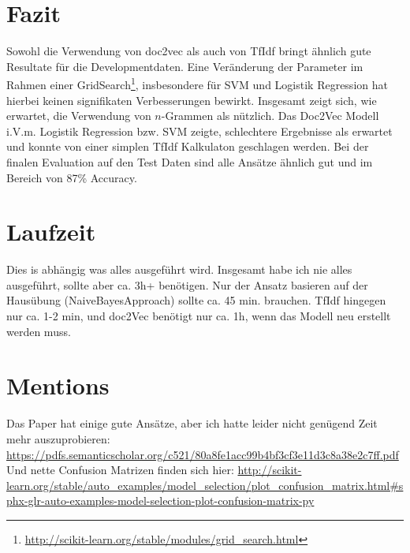 \documentclass[12pt]{scrartcl}
\begin{document}
    \section{Fazit}
    Sowohl die Verwendung von doc2vec als auch von TfIdf bringt ähnlich gute Resultate für die Developmentdaten.
    Eine Veränderung der Parameter im Rahmen einer GridSearch\footnote{\url{http://scikit-learn.org/stable/modules/grid_search.html}},
    insbesondere für SVM und Logistik Regression hat hierbei keinen signifikaten Verbesserungen bewirkt.
    Insgesamt zeigt sich, wie erwartet, die Verwendung von $n$-Grammen als nützlich.
    Das Doc2Vec Modell i.V.m. Logistik Regression bzw. SVM zeigte, schlechtere Ergebnisse als erwartet und konnte von einer
    \glqq{}simplen\grqq{} TfIdf Kalkulaton geschlagen werden.
    Bei der finalen Evaluation auf den Test Daten sind alle Ansätze ähnlich gut und im Bereich von 87\% Accuracy.

    \section{Laufzeit}
    Dies is abhängig was alles ausgeführt wird.
    Insgesamt habe ich nie alles ausgeführt, sollte aber ca. 3h+ benötigen.
    Nur der Ansatz basieren auf der Hausübung (NaiveBayesApproach) sollte ca. 45 min. brauchen.
    TfIdf hingegen nur ca. 1-2 min, und doc2Vec benötigt nur ca. 1h, wenn das Modell neu erstellt werden muss.

    \section{Mentions}
    Das Paper hat einige gute Ansätze, aber ich hatte leider nicht genügend Zeit mehr auszuprobieren:
    \url{https://pdfs.semanticscholar.org/c521/80a8fe1acc99b4bf3cf3e11d3c8a38e2c7ff.pdf}\\
    Und nette Confusion Matrizen finden sich hier:
    \url{http://scikit-learn.org/stable/auto_examples/model_selection/plot_confusion_matrix.html#sphx-glr-auto-examples-model-selection-plot-confusion-matrix-py}
\end{document}
